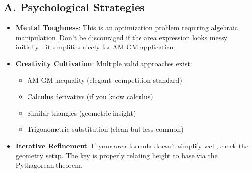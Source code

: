 \documentclass[12pt]{article}
\begin{document}
\begin{strategicbox}
\subsection*{A. Psychological Strategies}
\begin{itemize}[leftmargin=*]
    \item \textbf{Mental Toughness}: This is an optimization problem requiring algebraic manipulation. Don't be discouraged if the area expression looks messy initially - it simplifies nicely for AM-GM application.
    \item \textbf{Creativity Cultivation}: Multiple valid approaches exist:
    \begin{itemize}
        \item AM-GM inequality (elegant, competition-standard)
        \item Calculus derivative (if you know calculus)
        \item Similar triangles (geometric insight)
        \item Trigonometric substitution (clean but less common)
    \end{itemize}
    \item \textbf{Iterative Refinement}: If your area formula doesn't simplify well, check the geometry setup. The key is properly relating height to base via the Pythagorean theorem.
\end{itemize}


\end{strategicbox}
\end{document}
